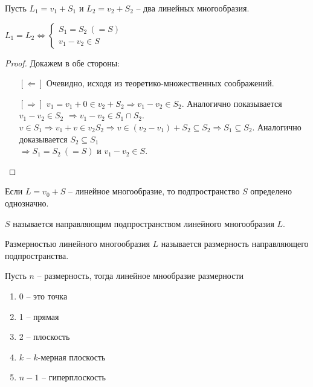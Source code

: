 Пусть $L_1 = v_1 + S_1$ и $L_2 = v_2 + S_2$ -- два линейных многообразия.
\begin{Suggestion}
	$L_1 = L_2 \Leftrightarrow 
	\begin{cases}
		S_1 = S_2 ~ (= S) \\
		v_1 - v_2 \in S
	\end{cases}$ 
\end{Suggestion}
\begin{proof}
	Докажем в обе стороны:
	\begin{enumerate}
		\item[{$[\Leftarrow]$}] Очевидно, исходя из теоретико-множественных соображений.
		\item[{$[\Rightarrow]$}] $v_1 = v_1 + 0 \in v_2 + S_2 \Rightarrow v_1 - v_2 \in S_2$. Аналогично показывается $v_1 - v_2 \in S_2$ $\Rightarrow v_1 - v_2 \in 
		S_1 \cap S_2$. \\
		$v \in S_1 \Rightarrow v_1 + v \in v_2  S_2 \Rightarrow v \in (v_2 - v_1) + S_2 \subseteq S_2 \Rightarrow S_1 \subseteq S_2$. Аналогично доказывается
		$S_2 \subseteq S_1$ \\
		$\Rightarrow S_1 = S_2 ~ (= S)$ и $v_1 - v_2 \in S$. 
	\end{enumerate}
\end{proof}
\begin{Consequence}
	Если $L = v_0 + S$ -- линейное многообразие, то подпространство $S$ определено однозначно.
\end{Consequence}

\begin{Def}
	$S$ называется направляющим подпространством линейного многообразия $L$.
\end{Def}

\begin{Def}
	Размерностью линейного многообразия $L$ называется размерность направляющего подпространства.
\end{Def}

Пусть $n$ -- размерность, тогда линейное мнообразие размерности
\begin{enumerate}[label=•]
	\item 0 -- это точка
	\item 1 -- прямая
	\item 2 -- плоскость
	\item {$k$} -- $k$-мерная плоскость
	\item {${n-1}$} -- гиперплоскость \\
\end{enumerate}

